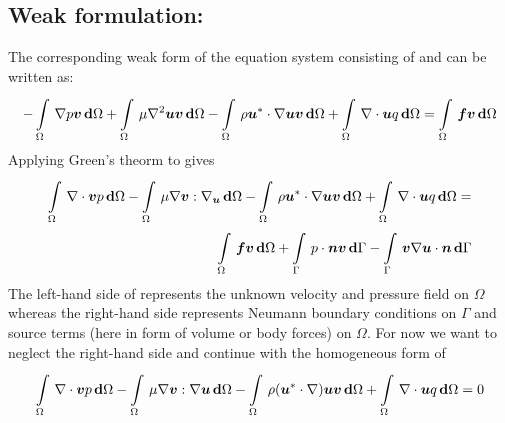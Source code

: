 \subsection{Weak formulation:}

The corresponding weak form of the equation system consisting of
 and  can be written
as:
\begin{equation}
  -\gint{\Omega}{}{\gradient{}{p}\vectr{v}}{\Omega}
  +\gint{\Omega}{}{\mu\laplacian{}{\vectr{u}}\vectr{v}}{\Omega}
  -\gint{\Omega}{}{\rho\dotprod{\vectr{u}^*}{\gradient{}{\vectr{u}}}\vectr{v} }{\Omega}
  +\gint{\Omega}{}{\divergence{}{\vectr{u}}q}{\Omega}=
  \gint{\Omega}{}{\vectr{f}\vectr{v}}{\Omega}  
  \label{eqn:Stokesweakform}
\end{equation}
Applying Green's theorm to  gives
\begin{equation}
  \begin{split}
  \gint{\Omega}{}{\divergence{}{\vectr{v}}p}{\Omega}
  -\gint{\Omega}{}{\mu\doubledotprod{\gradient{}{\vectr{v}}}{\gradient{\vectr{u}}}}{\Omega}
  -\gint{\Omega}{}{\rho\dotprod{\vectr{u}^*}{\gradient{}{\vectr{u}}}\vectr{v}}{\Omega}
  +\gint{\Omega}{}{\divergence{}{\vectr{u}}q}{\Omega}=\\
  \gint{\Omega}{}{\vectr{f}\vectr{v}}{\Omega}  
  +\gint{\Gamma}{}{\dotprod{p}{\vectr{n}\vectr{v}}}{\Gamma}
  -\gint{\Gamma}{}{\dotprod{\vectr{v}\gradient{}{\vectr{u}}}{\vectr{n}}}{\Gamma}
  \end{split}
  \label{eqn:Stokesweakform2}
\end{equation}
The left-hand side of  represents the unknown
velocity and pressure field on $\Omega$ whereas the right-hand side represents
Neumann boundary conditions on $\Gamma$ and source terms (here in form of
volume or body forces) on $\Omega$. For now we want to neglect the right-hand
side and continue with the homogeneous form of 
\begin{equation}
  \begin{split}
  \gint{\Omega}{}{\grad\cdot\vectr{v}p}{\Omega}
  -\gint{\Omega}{}{\mu\grad\vectr{v}:\grad\vectr{u}}{\Omega}
  -\gint{\Omega}{}{\rho(\vectr{u}^*\cdot\grad)\vectr{u}\vectr{v}}{\Omega}
  +\gint{\Omega}{}{\grad\cdot \vectr{u}q}{\Omega}=0
  \end{split}
  \label{eqn:Stokesweakform3}
\end{equation}

